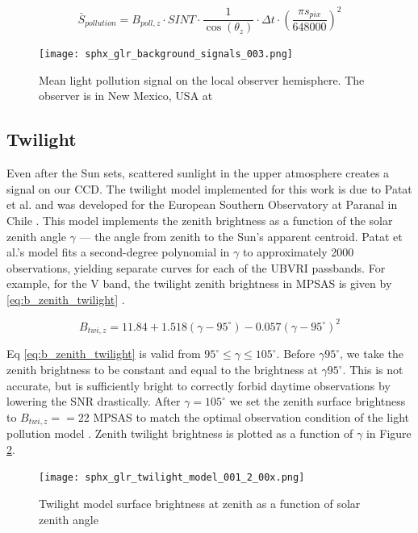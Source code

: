 \begin{equation} \label{eq:pollution_adu}
  \bar{S}_{pollution} = B_{poll,z} \cdot SINT \cdot \frac{1}{\cos(\theta_z)} \cdot \Delta t \cdot \left( \frac{\pi s_{pix}}{648000} \right)^2
\end{equation}

\begin{figure}[ht]
  \centering
  \texttt{[image: sphx\_glr\_background\_signals\_003.png]}
  \caption{Mean light pollution signal on the local observer hemisphere. The observer is in New Mexico, USA at
  \pogslla}
  \label{fig:pollution_hemi}
\end{figure}

\subsection{Twilight}

Even after the Sun sets, scattered sunlight in the upper atmosphere creates a signal on our CCD. The twilight model implemented for this work is due to Patat et al. and was developed for the European Southern Observatory at Paranal in Chile \cite{patat2006}. This model implements the zenith brightness as a function of the solar zenith angle $\gamma$ --- the angle from zenith to the Sun's apparent centroid. Patat et al.'s model fits a second-degree polynomial in $\gamma$ to approximately 2000 observations, yielding separate curves for each of the UBVRI passbands. For example, for the V band, the twilight zenith brightness in MPSAS is given by \ref{eq:b_zenith_twilight} \cite{patat2006}.

\begin{equation} \label{eq:b_zenith_twilight}
  B_{twi,z} = 11.84 + 1.518(\gamma - 95^\circ) - 0.057 (\gamma -  95^\circ)^2
\end{equation}

Eq \ref{eq:b_zenith_twilight} is valid from $95^\circ \leq \gamma \leq 105^\circ$. Before $\gamma 95^\circ$, we take the zenith brightness to be constant and equal to the brightness at $\gamma 95^\circ$. This is not accurate, but is sufficiently bright to correctly forbid daytime observations by lowering the SNR drastically. After $\gamma = 105^\circ$ we set the zenith surface brightness to $B_{twi,z} == 22$ MPSAS to match the optimal observation condition of the light pollution model \cite{krag2003}. Zenith twilight brightness is plotted as a function of $\gamma$ in Figure \ref{fig:twilight_model}.

\begin{figure}[ht]
  \centering
  \texttt{[image: sphx\_glr\_twilight\_model\_001\_2\_00x.png]}
  \caption{Twilight model surface brightness at zenith as a function of solar zenith angle}
  \label{fig:twilight_model}
\end{figure}

